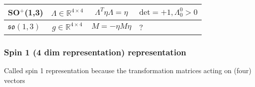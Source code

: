 \documentclass[../main.tex]{subfiles}
\begin{document}
\begin{itemize}
\begin{center}
\begin{tabular}{|l|c|c|l|}
\hline
SO$^+$(1,3) & $\Lambda\in\mathbb{R}^{4\times4}$ & $\Lambda^T\eta\Lambda=\eta$ & $\text{det}=+1, \Lambda^0_0>0$\\ \hline
$\mathfrak{so}(1,3)$ & $g\in\mathbb{R}^{4\times4} $ & $M=-\eta M\eta$ & ? \\ \hline
\end{tabular}
\end{center}

\subsubsection{Spin 1 (4 dim representation) representation}
Called spin 1 representation because the transformation matrices acting on (four) vectors 


\end{itemize}
\end{document}

